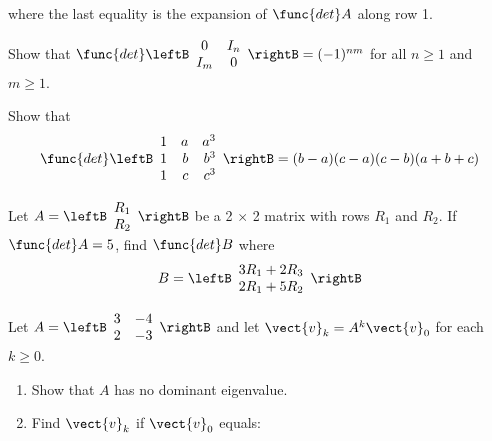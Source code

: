 \begin{multicols}{2}
\begin{supex}
\begin{supsol}
\begin{enumerate}[label={\alph*.}]
where the last equality is the expansion of $\func{det }A$ along row 1.
\end{enumerate}
\end{supsol}
\end{supex}

\begin{supex}
Show that $\func{det} \leftB \begin{array}{cc}
0 & I_n \\
I_m & 0 
\end{array}\rightB = (-1)^{nm}$
 for all $n \geq 1$ and $m \geq 1$.

\end{supex}

\begin{supex}
Show that
\begin{equation*}
\func{det} \leftB \begin{array}{rrr}
1 & a & a^3 \\
1 & b & b^3 \\
1 & c & c^3 
\end{array}\rightB = (b-a)(c-a)(c-b)(a+b+c)
\end{equation*}
\end{supex}


\begin{supex}
Let $A = \leftB \begin{array}{c}
R_1 \\
R_2
\end{array}\rightB$
 be a 2 $\times$ 2 matrix with rows $R_{1}$ and $R_{2}$. If $\func{det }A = 5$, find $\func{det }B$ where
\begin{equation*}
B = \leftB \begin{array}{c}
3R_1 + 2R_3 \\
2R_1 + 5R_2
\end{array}\rightB
\end{equation*}
\end{supex}

\begin{supex}
Let $A = \leftB \begin{array}{rr}
3 & -4 \\
2 & -3 
\end{array}\rightB$
 and let $\vect{v}_{k} = A^{k}\vect{v}_{0}$ for each $k \geq 0$.


\begin{enumerate}[label={\alph*.}]
\item Show that $A$ has no dominant eigenvalue.

\item Find $\vect{v}_{k}$ if $\vect{v}_{0}$ equals:



\end{enumerate}
\end{supex}
\end{multicols}
